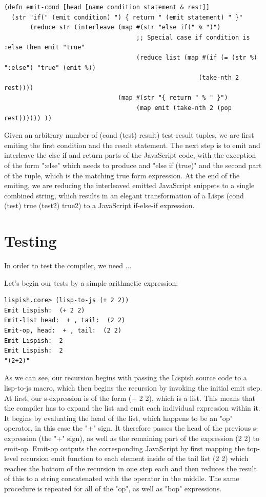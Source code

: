 \begin{verbatim}
(defn emit-cond [head [name condition statement & rest]]
  (str "if(" (emit condition) ") { return " (emit statement) " }"
       (reduce str (interleave (map #(str "else if(" % ")")
                                    ;; Special case if condition is :else then emit "true"
                                    (reduce list (map #(if (= (str %) ":else") "true" (emit %))
                                                     (take-nth 2 rest))))
                               (map #(str "{ return " % " }")
                                    (map emit (take-nth 2 (pop rest)))))) ))
\end{verbatim}

Given an arbitrary number of (cond (test) result) test-result tuples, we are first emiting the first condition and the result statement. The next step is to emit and interleave the else if and return parts of the JavaScript code, with the exception of the form ":else" which needs to produce and "else if (true)" and the second part of the tuple, which is the matching true form expression.
At the end of the emiting, we are reducing the interleaved emitted JavaScript snippets to a single combined string, which results in an elegant transformation of a Lisps (cond (test) true (test2) true2) to a JavaScript if-else-if expression.

\section{Testing}
In order to test the compiler, we need ...

Let's begin our tests by a simple arithmetic expression:
\begin{verbatim}
lispish.core> (lisp-to-js (+ 2 2))
Emit Lispish:  (+ 2 2)
Emit-list head:  + , tail:  (2 2)
Emit-op, head:  + , tail:  (2 2)
Emit Lispish:  2
Emit Lispish:  2
"(2+2)"
\end{verbatim}
As we can see, our recursion begins with passing the Lispish source code to a lisp-to-js macro, which then begins the recursion by invoking the initial emit step.
At first, our s-expression is of the form (+ 2 2), which is a list. This means that the compiler has to expand the list and emit each individual expression within it. It begins by evaluating the head of the list, which happens to be an "op" operator, in this case the "+" sign. 
It therefore passes the head of the previous s-expression (the "+" sign), as well as the remaining part of the expression (2 2) to emit-op. 
Emit-op outputs the corresponding JavaScript by first mapping the top-level recursion emit function to each element inside of the tail list (2 2) which reaches the bottom of the recursion in one step each and then reduces the result of this to a string concatenated with the operator in the middle.
The same procedure is repeated for all of the "op", as well as "bop" expressions.

